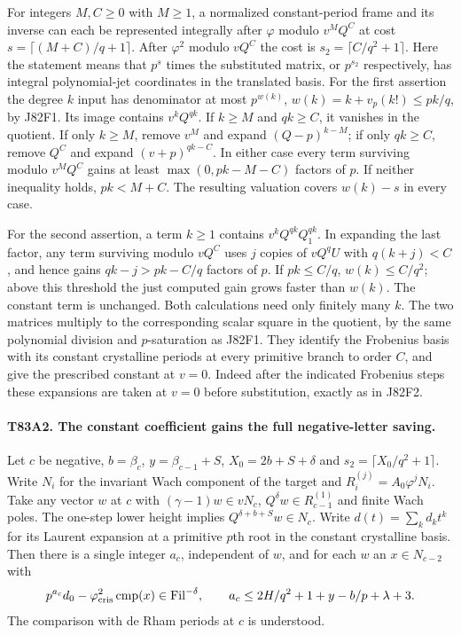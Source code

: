 For integers $M,C\ge0$ with $M\ge1$, a normalized constant-period
frame and its inverse can each be represented integrally after
$\varphi$ modulo $v^M Q^C$ at cost
$s=\lceil(M+C)/q+1\rceil$. After $\varphi^2$ modulo
$vQ^C$ the cost is $s_2=\lceil C/q^2+1\rceil$. Here the statement
means that $p^s$ times the substituted matrix, or $p^{s_2}$
respectively, has integral polynomial-jet coordinates in the
translated basis. For the first assertion the degree $k$ input
has denominator at most $p^{w(k)}$, $w(k)=k+v_p(k!)\le pk/q$,
by J82F1. Its image contains $v^kQ^{qk}$. If $k\ge M$ and
$qk\ge C$, it vanishes in the quotient. If only $k\ge M$,
remove $v^M$ and expand $(Q-p)^{k-M}$; if only $qk\ge C$,
remove $Q^C$ and expand $(v+p)^{qk-C}$. In either case every
term surviving modulo $v^M Q^C$ gains at least
$\max(0,pk-M-C)$ factors of $p$. If neither inequality holds,
$pk<M+C$. The resulting valuation covers $w(k)-s$ in every case.

For the second assertion, a term $k\ge1$ contains
$v^kQ^{qk}Q_1^{qk}$. In expanding the last factor, any term
surviving modulo $vQ^C$ uses $j$ copies of $vQ^qU$ with
$q(k+j)<C$, and hence gains $qk-j>pk-C/q$ factors of $p$.
If $pk\le C/q$, $w(k)\le C/q^2$; above this threshold the just
computed gain grows faster than $w(k)$. The constant term is
unchanged. Both calculations need only finitely many $k$.
The two matrices multiply to the corresponding scalar square in
the quotient, by the same polynomial division and $p$-saturation
as J82F1. They identify the Frobenius basis with its constant
crystalline periods at every primitive branch to order $C$,
and give the prescribed constant at $v=0$. Indeed after the
indicated Frobenius steps these expansions are taken at $v=0$
before substitution, exactly as in J82F2.

\paragraph{T83A2. The constant coefficient gains the full negative-letter saving.}
Let $c$ be negative, $b=\beta_c$, $y=\beta_{c-1}+S$,
$X_0=2b+S+\delta$ and $s_2=\lceil X_0/q^2+1\rceil$.
Write $N_i$ for the invariant Wach component of the target and
$R_i^{(j)}=A_0\varphi^jN_i$. Take any vector $w$ at $c$ with
$(\gamma-1)w\in vN_c$, $Q^\delta w\in R_{c-1}^{(1)}$
and finite Wach poles. The one-step lower height implies
$Q^{\delta+b+S}w\in N_c$. Write $d(t)=\sum_k d_k t^k$ for
its Laurent expansion at a primitive $p$th root in the constant
crystalline basis. Then there is a single integer $a_c$, independent
of $w$, and for each $w$ an $x\in N_{c-2}$ with
\[
 p^{a_c}d_0-\varphi_{\rm cris}^2\operatorname{cmp}(x)
   \in\operatorname{Fil}^{-\delta},\qquad
 a_c\le 2H/q^2+1+y-b/p+\lambda+3 .
\]
The comparison with de Rham periods at $c$ is understood.

